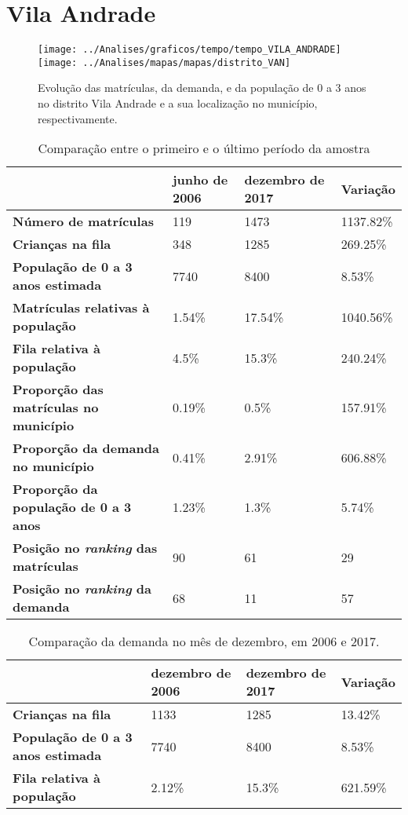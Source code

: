 \section{Vila Andrade}
\begin{figure}[H]
\centering
\texttt{[image: ../Analises/graficos/tempo/tempo\_VILA\_ANDRADE]}
\texttt{[image: ../Analises/mapas/mapas/distrito\_VAN]}
\caption{Evolução das matrículas, da demanda, e da população de 0 a 3 anos no distrito Vila Andrade e a sua localização no município, respectivamente.}
\end{figure}
\begin{table}[H]
\begin{tabular}{l|l|l|l}
\textbf{}                                      & \textbf{junho de 2006}       & \textbf{dezembro de 2017}    & \textbf{Variação} \\ \hline
\textbf{Número de matrículas}                  & 119 & 1473 & 1137.82\% \\ \hline
\textbf{Crianças na fila}                      & 348 & 1285 & 269.25\% \\ \hline
\textbf{População de 0 a 3 anos estimada}      & 7740 & 8400 & 8.53\% \\ \hline
\textbf{Matrículas relativas à população}      & 1.54\% & 17.54\% & 1040.56\% \\ \hline
\textbf{Fila relativa à população}             & 4.5\% & 15.3\% & 240.24\% \\ \hline
\textbf{Proporção das matrículas no município} & 0.19\% & 0.5\% & 157.91\% \\ \hline
\textbf{Proporção da demanda no município}     & 0.41\% & 2.91\% & 606.88\% \\ \hline
\textbf{Proporção da população de 0 a 3 anos}  & 1.23\% & 1.3\% & 5.74\% \\ \hline
\textbf{Posição no \textit{ranking} das matrículas}     & 90 & 61 & 29 \\ \hline
\textbf{Posição no \textit{ranking} da demanda}         & 68 & 11 & 57 \\ 
\end{tabular}
\caption{Comparação entre o primeiro e o último período da amostra}
\end{table}
\begin{table}[H]
\begin{tabular}{l|l|l|l}
\textbf{}                                 & \textbf{dezembro de 2006} & \textbf{dezembro de 2017} & \textbf{Variação} \\ \hline
\textbf{Crianças na fila}                      & 1133 & 1285 & 13.42\% \\ \hline
\textbf{População de 0 a 3 anos estimada}      & 7740 & 8400 & 8.53\% \\ \hline
\textbf{Fila relativa à população}             & 2.12\% & 15.3\% & 621.59\% \\
\end{tabular}
\caption{Comparação da demanda no mês de dezembro, em 2006 e 2017.}
\end{table}
